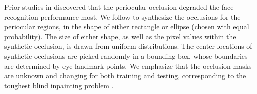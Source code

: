 \documentclass[10pt,twocolumn,twoside]{IEEEtran} %
\begin{document}
Prior studies in \cite{karahan2016image} discovered that the periocular occlusion degraded the face recognition performance most. We follow \cite{karahan2016image} to synthesize the occlusions for the periocular regions, in the shape of either rectangle or ellipse (chosen with equal probability). The size of either shape, as well as the pixel values within the synthetic occlusion, is drawn from uniform distributions. The center locations of synthetic occlusions are picked randomly in a bounding box, whose boundaries are determined by eye landmark points. We emphasize that the occlusion masks are unknown and changing for both training and testing, corresponding to the toughest blind inpainting problem \cite{xie2012image}. 
\end{document}

